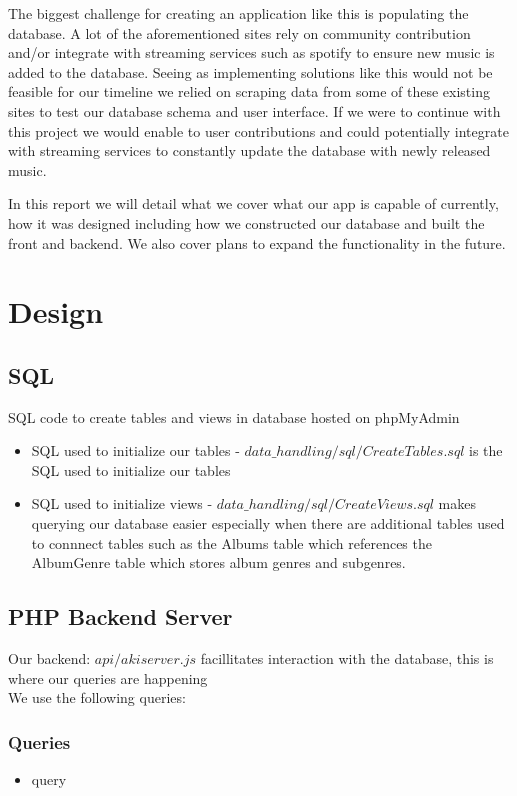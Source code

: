 \documentclass{article}
\begin{document}
The biggest challenge for creating an application like this is populating the database. 
A lot of the aforementioned sites rely on community contribution and/or integrate with streaming services such as spotify to ensure new music is added to the database. 
Seeing as implementing solutions like this would not be feasible for our timeline we relied on scraping data from some of these existing sites to test our database schema 
and user interface. If we were to continue with this project we would enable to user contributions and could potentially integrate with streaming services to constantly 
update the database with newly released music.

In this report we will detail what we cover what our app is capable of currently, how it was designed including how we constructed our database and built the front and backend. 
We also cover plans to expand the functionality in the future.

\pagebreak


\section{Design}
    \subsection{SQL} SQL code to create tables and views in database hosted on phpMyAdmin
    \begin{itemize}
        \item SQL used to initialize our tables 
        - $data\_handling/sql/CreateTables.sql$ is the SQL used to initialize our tables
        \item SQL used to initialize views 
        - $data\_handling/sql/CreateViews.sql$ makes querying our database easier especially when there are additional tables
        used to connnect tables such as the Albums table which references the AlbumGenre table which stores album genres and subgenres.
    \end{itemize}

    \subsection{PHP Backend Server} Our backend: $api/akiserver.js$ facillitates interaction with the database, this is where our queries are happening \\ 
    We use the following queries:
    \subsubsection{Queries}
    \begin{itemize}
        \item query
    \end{itemize}
\end{document}
